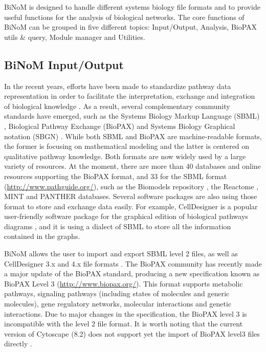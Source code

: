 \documentclass[10pt]{bmc_article}
\newenvironment{bmcformat}{\baselineskip20pt\sloppy\setboolean{publ}{false}}{\baselineskip20pt\sloppy}
\begin{document}
\begin{bmcformat}
BiNoM is designed to handle different systems biology file formats and to
provide useful functions for the analysis of biological networks. The core
functions of BiNoM can be grouped in five different topics: Input/Output,
Analysis, BioPAX utils \& query, Module manager and Utilities.


\subsection*{BiNoM Input/Output}
In the recent years, efforts have been made to standardize pathway data
representation in order to facilitate the interpretation, exchange and
integration of biological knowledge \cite{klipp2007systems}. As a result,
several complementary community standards have emerged, such as the Systems
Biology Markup Language (SBML) \cite{hucka2003systems}, Biological Pathway
Exchange (BioPAX) \cite{demir2010biopax} and Systems Biology Graphical notation
(SBGN) \cite{le2009systems}. While both SBML and BioPAX are machine-readable
formats, the former is focusing on mathematical modeling and the latter is
centered on qualitative pathway knowledge. Both formats are now widely used by a
large variety of resources. At the moment, there are more than 40 databases and
online resources supporting the BioPAX format, and 33 for the SBML format
(\url{http://www.pathguide.org/}), such as the Biomodels repository
\cite{le2006biomodels}, the Reactome  \cite{joshi2005reactome}, MINT
\cite{zanzoni2002mint} and PANTHER \cite{mi2010panther} databases. 
Several software packages are also using those format to store and exchange data
easily. For example, CellDesigner is a popular user-friendly software package
for the graphical edition of biological pathways diagrams
\cite{funahashi2003celldesigner}, and it is using a dialect
of SBML to store all the information contained in the graphs.

BiNoM allows the user to import and export SBML level 2 files, as well as
CellDesigner 3.x and 4.x file formats \cite{zinovyev2008binom}. The BioPAX
community has recently made a major update of the BioPAX standard, producing a
new specification known as BioPAX Level 3 (\url{http://www.biopax.org/}). This
format
supports metabolic pathways, signaling pathways (including states of molecules
and generic molecules), gene regulatory networks, molecular interactions and
genetic interactions. Due to major changes in the
specification, the BioPAX level 3 is incompatible with the level 2 file format.
It is worth noting that the current version of Cytoscape (8.2) does not support
yet the import of BioPAX level3 files directly \cite{demir2010biopax}.


\end{bmcformat}
\end{document}
